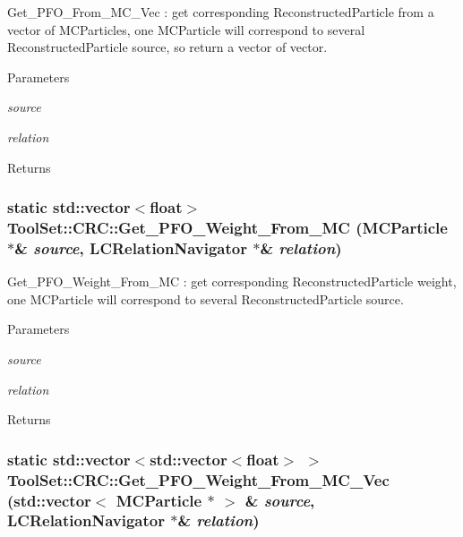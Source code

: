 Get\_\-PFO\_\-From\_\-MC\_\-Vec : get corresponding ReconstructedParticle from a vector of MCParticles, one MCParticle will correspond to several ReconstructedParticle source, so return a vector of vector. 
\begin{DoxyParams}{Parameters}
\item[{\em source}]\item[{\em relation}]\end{DoxyParams}
\begin{DoxyReturn}{Returns}

\end{DoxyReturn}
\hypertarget{classToolSet_1_1CRC_a384a4d9c72384db38104b6c67b7b6c5d}{
\subsubsection[{Get\_\-PFO\_\-Weight\_\-From\_\-MC}]{\setlength{\rightskip}{0pt plus 5cm}static std::vector$<$float$>$ ToolSet::CRC::Get\_\-PFO\_\-Weight\_\-From\_\-MC (MCParticle $\ast$\& {\em source}, \/  LCRelationNavigator $\ast$\& {\em relation})}}
\label{classToolSet_1_1CRC_a384a4d9c72384db38104b6c67b7b6c5d}


Get\_\-PFO\_\-Weight\_\-From\_\-MC : get corresponding ReconstructedParticle weight, one MCParticle will correspond to several ReconstructedParticle source. 
\begin{DoxyParams}{Parameters}
\item[{\em source}]\item[{\em relation}]\end{DoxyParams}
\begin{DoxyReturn}{Returns}

\end{DoxyReturn}
\hypertarget{classToolSet_1_1CRC_acea8182f9deddac046a49604f3fba50b}{
\subsubsection[{Get\_\-PFO\_\-Weight\_\-From\_\-MC\_\-Vec}]{\setlength{\rightskip}{0pt plus 5cm}static std::vector$<$std::vector$<$float$>$ $>$ ToolSet::CRC::Get\_\-PFO\_\-Weight\_\-From\_\-MC\_\-Vec (std::vector$<$ MCParticle $\ast$ $>$ \& {\em source}, \/  LCRelationNavigator $\ast$\& {\em relation})}}
\label{classToolSet_1_1CRC_acea8182f9deddac046a49604f3fba50b}


